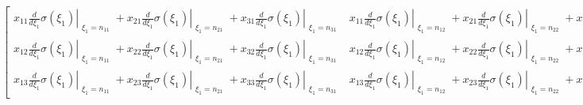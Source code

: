 \documentclass[11pt]{article}
\makeatletter
\newcommand{\boxspacing}{\kern\kvtcb@left@rule\kern\kvtcb@boxsep}
\newcommand{\prompt}[4]{
        \ttfamily\llap{{\color{#2}[#3]:\hspace{3pt}#4}}\vspace{-\baselineskip}
    }
\makeatother
\begin{document}
    $\displaystyle \left[\begin{matrix}x_{11} \left. \frac{d}{d \xi_{1}} \sigma{\left(\xi_{1} \right)} \right|_{\substack{ \xi_{1}=n_{11} }} + x_{21} \left. \frac{d}{d \xi_{1}} \sigma{\left(\xi_{1} \right)} \right|_{\substack{ \xi_{1}=n_{21} }} + x_{31} \left. \frac{d}{d \xi_{1}} \sigma{\left(\xi_{1} \right)} \right|_{\substack{ \xi_{1}=n_{31} }} & x_{11} \left. \frac{d}{d \xi_{1}} \sigma{\left(\xi_{1} \right)} \right|_{\substack{ \xi_{1}=n_{12} }} + x_{21} \left. \frac{d}{d \xi_{1}} \sigma{\left(\xi_{1} \right)} \right|_{\substack{ \xi_{1}=n_{22} }} + x_{31} \left. \frac{d}{d \xi_{1}} \sigma{\left(\xi_{1} \right)} \right|_{\substack{ \xi_{1}=n_{32} }}\\x_{12} \left. \frac{d}{d \xi_{1}} \sigma{\left(\xi_{1} \right)} \right|_{\substack{ \xi_{1}=n_{11} }} + x_{22} \left. \frac{d}{d \xi_{1}} \sigma{\left(\xi_{1} \right)} \right|_{\substack{ \xi_{1}=n_{21} }} + x_{32} \left. \frac{d}{d \xi_{1}} \sigma{\left(\xi_{1} \right)} \right|_{\substack{ \xi_{1}=n_{31} }} & x_{12} \left. \frac{d}{d \xi_{1}} \sigma{\left(\xi_{1} \right)} \right|_{\substack{ \xi_{1}=n_{12} }} + x_{22} \left. \frac{d}{d \xi_{1}} \sigma{\left(\xi_{1} \right)} \right|_{\substack{ \xi_{1}=n_{22} }} + x_{32} \left. \frac{d}{d \xi_{1}} \sigma{\left(\xi_{1} \right)} \right|_{\substack{ \xi_{1}=n_{32} }}\\x_{13} \left. \frac{d}{d \xi_{1}} \sigma{\left(\xi_{1} \right)} \right|_{\substack{ \xi_{1}=n_{11} }} + x_{23} \left. \frac{d}{d \xi_{1}} \sigma{\left(\xi_{1} \right)} \right|_{\substack{ \xi_{1}=n_{21} }} + x_{33} \left. \frac{d}{d \xi_{1}} \sigma{\left(\xi_{1} \right)} \right|_{\substack{ \xi_{1}=n_{31} }} & x_{13} \left. \frac{d}{d \xi_{1}} \sigma{\left(\xi_{1} \right)} \right|_{\substack{ \xi_{1}=n_{12} }} + x_{23} \left. \frac{d}{d \xi_{1}} \sigma{\left(\xi_{1} \right)} \right|_{\substack{ \xi_{1}=n_{22} }} + x_{33} \left. \frac{d}{d \xi_{1}} \sigma{\left(\xi_{1} \right)} \right|_{\substack{ \xi_{1}=n_{32} }}\end{matrix}\right]$

    

    \begin{tcolorbox}[breakable, size=fbox, boxrule=1pt, pad at break*=1mm,colback=cellbackground, colframe=cellborder]
\prompt{In}{incolor}{116}{\boxspacing}
\begin{Verbatim}[commandchars=\\\{\}]
\end{Verbatim}
\end{tcolorbox}
\end{document}
